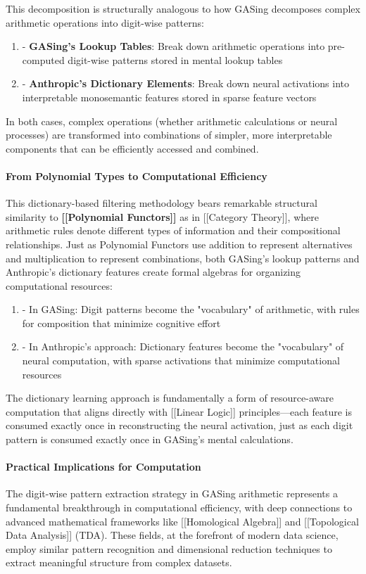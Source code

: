 This decomposition is structurally analogous to how GASing decomposes complex arithmetic operations into digit-wise patterns:

\begin{enumerate}
  \item - \textbf{GASing's Lookup Tables}: Break down arithmetic operations into pre-computed digit-wise patterns stored in mental lookup tables
  \item - \textbf{Anthropic's Dictionary Elements}: Break down neural activations into interpretable monosemantic features stored in sparse feature vectors
\end{enumerate}

In both cases, complex operations (whether arithmetic calculations or neural processes) are transformed into combinations of simpler, more interpretable components that can be efficiently accessed and combined.

\paragraph{From Polynomial Types to Computational Efficiency}
This dictionary-based filtering methodology bears remarkable structural similarity to \textbf{[[Polynomial Functors]]} as in [[Category Theory]], where arithmetic rules denote different types of information and their compositional relationships. Just as Polynomial Functors use addition to represent alternatives and multiplication to represent combinations, both GASing's lookup patterns and Anthropic's dictionary features create formal algebras for organizing computational resources:

\begin{enumerate}
  \item - In GASing: Digit patterns become the "vocabulary" of arithmetic, with rules for composition that minimize cognitive effort
  \item - In Anthropic's approach: Dictionary features become the "vocabulary" of neural computation, with sparse activations that minimize computational resources
\end{enumerate}

The dictionary learning approach is fundamentally a form of resource-aware computation that aligns directly with [[Linear Logic]] principles—each feature is consumed exactly once in reconstructing the neural activation, just as each digit pattern is consumed exactly once in GASing's mental calculations.

\paragraph{Practical Implications for Computation}
The digit-wise pattern extraction strategy in GASing arithmetic represents a fundamental breakthrough in computational efficiency, with deep connections to advanced mathematical frameworks like [[Homological Algebra]] and [[Topological Data Analysis]] (TDA). These fields, at the forefront of modern data science, employ similar pattern recognition and dimensional reduction techniques to extract meaningful structure from complex datasets.

